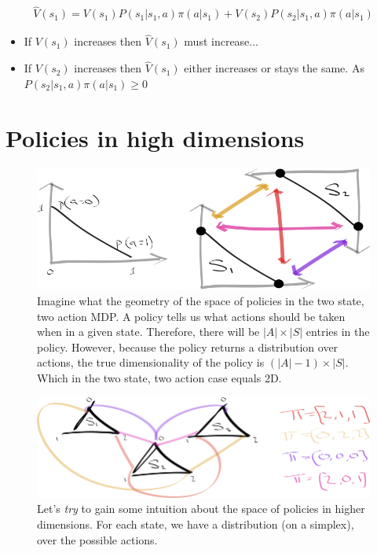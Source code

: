 \begin{align}
\hat V(s_1) = V(s_1)P(s_1|s_1, a)\pi(a|s_1) + V(s_2)P(s_2|s_1, a)\pi(a|s_1)
\end{align}

\begin{itemize}
\tightlist
\item
If $V(s_1)$ increases then $\hat V(s_1)$ must increase...
\item
If $V(s_2)$ increases then $\hat V(s_1)$  either increases or stays the same. As $P(s_2|s_1, a)\pi(a|s_1) \ge 0$
\end{itemize}

\section{Policies in high dimensions}



\begin{figure}
\centering
\includegraphics[width=1\textwidth,height=0.25\textheight]{../../pictures/drawings/2-state-2-action-simplices.png}
\caption{Imagine what the geometry of the space of policies in the two state, two action MDP. A policy tells us what actions should be taken when in a given state. Therefore, there will be \(|A| \times |S|\) entries in the policy. However, because the policy returns a distribution over actions, the true dimensionality of the policy is \((|A| -1) \times |S|\). Which in the two state, two action case equals 2D.}
\end{figure}

\begin{figure}
\centering
\includegraphics[width=1\textwidth,height=0.25\textheight]{../../pictures/drawings/3-state-3-action-simplices.png}
\caption{Let's \textit{try} to gain some intuition about the space of policies in higher dimensions.
For each state, we have a distribution (on a simplex), over the possible actions.}
\end{figure}
